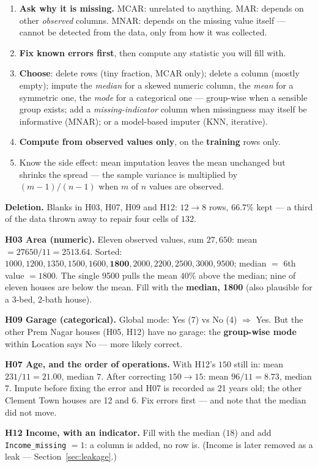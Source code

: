 \documentclass[11pt]{article}
\newcommand{\method}[1]{\begin{keyidea}[The method: #1]}
\begin{document}
\method{handling a blank}
\begin{enumerate}
  \item \textbf{Ask why it is missing.} MCAR: unrelated to anything. MAR:
    depends on other \emph{observed} columns. MNAR: depends on the missing
    value itself --- cannot be detected from the data, only from how it was
    collected.
  \item \textbf{Fix known errors first}, then compute any statistic you will
    fill with.
  \item \textbf{Choose}: delete rows (tiny fraction, MCAR only); delete a
    column (mostly empty); impute the \emph{median} for a skewed numeric column,
    the \emph{mean} for a symmetric one, the \emph{mode} for a categorical one
    --- group-wise when a sensible group exists; add a
    \emph{missing-indicator} column when missingness may itself be
    informative (MNAR); or a model-based imputer (KNN, iterative).
  \item \textbf{Compute from observed values only}, on the \textbf{training}
    rows only.
  \item Know the side effect: mean imputation leaves the mean unchanged but
    shrinks the spread --- the sample variance is multiplied by
    $(m-1)/(n-1)$ when $m$ of $n$ values are observed.
\end{enumerate}
\end{keyidea}

\begin{worked}
\textbf{Deletion.} Blanks in H03, H07, H09 and H12: $12 \to 8$ rows, $66.7\%$
kept --- a third of the data thrown away to repair four cells of $132$.

\textbf{H03 Area (numeric).} Eleven observed values, sum $27{,}650$:
mean $= 27650/11 = 2513.64$. Sorted: $1000, 1200, 1350, 1500, 1600,
\mathbf{1800}, 2000, 2200, 2500, 3000, 9500$; median $=$ 6th value $= 1800$.
The single 9500 pulls the mean $40\%$ above the median; nine of eleven houses
are below the mean. Fill with the \textbf{median, 1800} (also plausible for a
3-bed, 2-bath house).

\textbf{H09 Garage (categorical).} Global mode: Yes (7) vs No (4) $\Rightarrow$
Yes. But the other Prem Nagar houses (H05, H12) have no garage: the
\textbf{group-wise mode} within Location says No --- more likely correct.

\textbf{H07 Age, and the order of operations.} With H12's $150$ still in: mean
$231/11 = 21.00$, median $7$. After correcting $150 \to 15$: mean $96/11 =
8.73$, median $7$. Impute before fixing the error and H07 is recorded as 21
years old; the other Clement Town houses are 12 and 6. Fix errors first --- and note that the
median did not move.

\textbf{H12 Income, with an indicator.} Fill with the median ($18$) and add
\texttt{Income\_missing} $= 1$: a column is added, no row is. (Income is later
removed as a leak --- Section~\ref{sec:leakage}.)
\end{worked}
\end{document}
